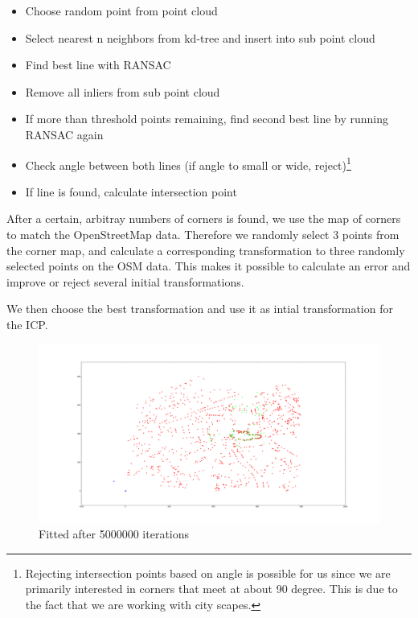 \documentclass[10pt,twocolumn,letterpaper]{article}
\begin{document}
\begin{itemize}
    \item Choose random point from point cloud
    \item Select nearest n neighbors from kd-tree and insert into sub point cloud
    \item Find best line with RANSAC
    \item Remove all inliers from sub point cloud
    \item If more than threshold points remaining, find second best line by running RANSAC again
    \item Check angle between both lines (if angle to small or wide, reject)\footnote{Rejecting intersection points based on angle is possible for us since we are primarily interested in corners that meet at about 90 degree. This is due to the fact that we are working with city scapes.} 
    \item If line is found, calculate intersection point
\end{itemize} 

After a certain, arbitray numbers of corners is found, we use the map of corners to match the OpenStreetMap data. Therefore we randomly select 3 points from the corner map, and calculate a corresponding transformation to three randomly selected points on the OSM data. This makes it possible to calculate an error and improve or reject several initial transformations.

We then choose the best transformation and use it as intial transformation for the ICP.

\begin{figure}
  \centering
  \includegraphics[width=.8\linewidth]{images/goodmatch.png}
  \caption{Fitted after 5000000 iterations}
  \label{fig:goodmatch}
\end{figure}
\end{document}
